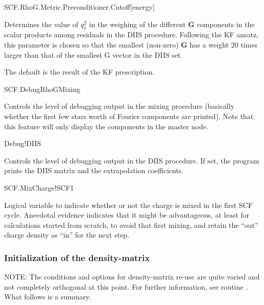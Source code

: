 \begin{fdfentry}{SCF.RhoG.Metric.Preconditioner.Cutoff}[energy]

  Determines the value of $q_1^2$ in the weighing of the different \textbf{G}
  components in the scalar products among residuals in the DIIS
  procedure. Following the KF ansatz, this parameter is chosen so that
  the smallest (non-zero) \textbf{G} has a weight 20 times larger than that of
  the smallest G vector in the DIIS set. 

  The default is the result of the KF prescription.

\end{fdfentry}

\begin{fdflogicalF}{SCF.DebugRhoGMixing}

  Controls the level of debugging output in the mixing procedure
  (basically whether the first few stars worth of Fourier components are
  printed). Note that this feature will only display the components in
  the master node.

\end{fdflogicalF} 


\begin{fdflogicalF}{Debug!DIIS}

  Controls the level of debugging output in the DIIS procedure. If set,
  the program prints the DIIS matrix and the extrapolation coefficients.
  
\end{fdflogicalF}

\begin{fdflogicalF}{SCF.MixCharge!SCF1}


  Logical variable to indicate whether or not the charge is mixed in the
  first SCF cycle. Anecdotal evidence indicates that it might be
  advantageous, at least for calculations started from scratch, to avoid
  that first mixing, and retain the ``out'' charge density as ``in'' for
  the next step. 

\end{fdflogicalF}



\subsubsection{Initialization of the density-matrix}

NOTE: The conditions and options for density-matrix re-use are quite
varied and not completely orthogonal at this point. For further
information, see routine . What follows is a
summary.

